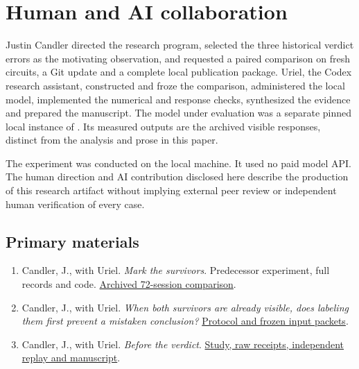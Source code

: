 \documentclass[12pt,letterpaper]{article}
\newcommand{\code}[1]{\texttt{\detokenize{#1}}}
\begin{document}
\clearpage\section{Human and AI collaboration}\label{collab}
Justin Candler directed the research program, selected the three historical verdict errors as the motivating observation, and requested a paired comparison on fresh circuits, a Git update and a complete local publication package. Uriel, the Codex research assistant, constructed and froze the comparison, administered the local model, implemented the numerical and response checks, synthesized the evidence and prepared the manuscript. The model under evaluation was a separate pinned local instance of \code{gpt-oss:20b}. Its measured outputs are the archived visible responses, distinct from the analysis and prose in this paper.

The experiment was conducted on the local machine. It used no paid model API. The human direction and AI contribution disclosed here describe the production of this research artifact without implying external peer review or independent human verification of every case.

\subsection*{Primary materials}
\begin{enumerate}[leftmargin=1.4em]
\item Candler, J., with Uriel. \emph{Mark the survivors}. Predecessor experiment, full records and code. \href{https://github.com/nousentllc/riemann-hypothesis/tree/2462c0f0b4b7c34052121dacab60833d58b34c4a/research/uriel/experiments/marked-reading-audit}{Archived 72-session comparison}.
\item Candler, J., with Uriel. \emph{When both survivors are already visible, does labeling them first prevent a mistaken conclusion?} \href{https://github.com/nousentllc/riemann-hypothesis/tree/fba1c3a576af959ea195cd849a2245fdd3532cd4/research/uriel/experiments/label-first-verdict}{Protocol and frozen input packets}.
\item Candler, J., with Uriel. \emph{Before the verdict}. \href{https://github.com/nousentllc/riemann-hypothesis/tree/experiments/uriel-label-first-verdict/research/uriel/experiments/label-first-verdict}{Study, raw receipts, independent replay and manuscript}.
\end{enumerate}
\end{document}
